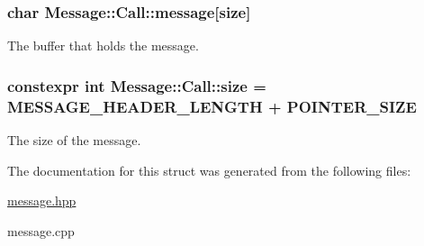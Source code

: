 \subsubsection[{\texorpdfstring{message}{message}}]{\setlength{\rightskip}{0pt plus 5cm}char Message\+::\+Call\+::message\mbox{[}{\bf size}\mbox{]}}\hypertarget{struct_message_1_1_call_ab2d9545785f8d916a0a19d798bce5517}{}\label{struct_message_1_1_call_ab2d9545785f8d916a0a19d798bce5517}


The buffer that holds the message. 

\subsubsection[{\texorpdfstring{size}{size}}]{\setlength{\rightskip}{0pt plus 5cm}constexpr int Message\+::\+Call\+::size = {\bf M\+E\+S\+S\+A\+G\+E\+\_\+\+H\+E\+A\+D\+E\+R\+\_\+\+L\+E\+N\+G\+TH} + {\bf P\+O\+I\+N\+T\+E\+R\+\_\+\+S\+I\+ZE}\hspace{0.3cm}{\ttfamily [static]}}\hypertarget{struct_message_1_1_call_af3bcd2cba96de67284b697d2bc5106e9}{}\label{struct_message_1_1_call_af3bcd2cba96de67284b697d2bc5106e9}


The size of the message. 



The documentation for this struct was generated from the following files\+:\begin{DoxyCompactItemize}
\item 
\hyperlink{message_8hpp}{message.\+hpp}\item 
message.\+cpp\end{DoxyCompactItemize}
